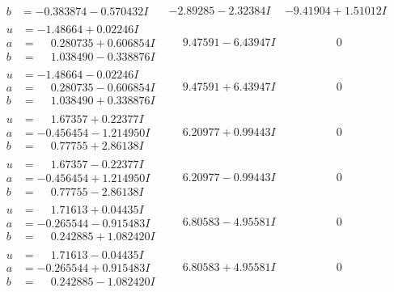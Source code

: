 \documentclass[1p]{elsarticle_modified}
\theoremstyle{definition}
\begin{document}
$$\begin{array}{c|c|c}
\begin{aligned}
b &= -0.383874 - 0.570432 I\end{aligned}
 & -2.89285 - 2.32384 I & -9.41904 + 1.51012 I \\ \hline\begin{aligned}
u &= -1.48664 + 0.02246 I \\
a &= \phantom{-}0.280735 + 0.606854 I \\
b &= \phantom{-}1.038490 - 0.338876 I\end{aligned}
 & \phantom{-}9.47591 - 6.43947 I & \phantom{-0.000000 } 0 \\ \hline\begin{aligned}
u &= -1.48664 - 0.02246 I \\
a &= \phantom{-}0.280735 - 0.606854 I \\
b &= \phantom{-}1.038490 + 0.338876 I\end{aligned}
 & \phantom{-}9.47591 + 6.43947 I & \phantom{-0.000000 } 0 \\ \hline\begin{aligned}
u &= \phantom{-}1.67357 + 0.22377 I \\
a &= -0.456454 - 1.214950 I \\
b &= \phantom{-}0.77755 + 2.86138 I\end{aligned}
 & \phantom{-}6.20977 + 0.99443 I & \phantom{-0.000000 } 0 \\ \hline\begin{aligned}
u &= \phantom{-}1.67357 - 0.22377 I \\
a &= -0.456454 + 1.214950 I \\
b &= \phantom{-}0.77755 - 2.86138 I\end{aligned}
 & \phantom{-}6.20977 - 0.99443 I & \phantom{-0.000000 } 0 \\ \hline\begin{aligned}
u &= \phantom{-}1.71613 + 0.04435 I \\
a &= -0.265544 - 0.915483 I \\
b &= \phantom{-}0.242885 + 1.082420 I\end{aligned}
 & \phantom{-}6.80583 - 4.95581 I & \phantom{-0.000000 } 0 \\ \hline\begin{aligned}
u &= \phantom{-}1.71613 - 0.04435 I \\
a &= -0.265544 + 0.915483 I \\
b &= \phantom{-}0.242885 - 1.082420 I\end{aligned}
 & \phantom{-}6.80583 + 4.95581 I & \phantom{-0.000000 } 0 \\ \hline\begin{aligned}

\end{aligned}
\end{array}$$
\end{document}
